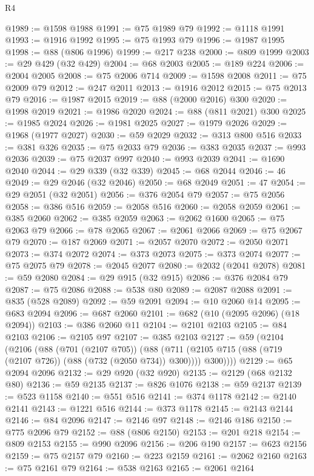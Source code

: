 \begin{lexlean}{R4}
\begin{coremodule}
@1989 := @1598 @1988
@1991 := @75 @1989 @79
@1992 := @1118 @1991
@1993 := @1916 @1992
@1995 := @75 @1993 @79
@1996 := @1987 @1995
@1998 := @88 (@806 @1996)
@1999 := @217 @238
@2000 := @809 @1999
@2003 := @29 @429 (@32 @429)
@2004 := @68 @2003
@2005 := @189 @224
@2006 := @2004 @2005
@2008 := @75 @2006 @714
@2009 := @1598 @2008
@2011 := @75 @2009 @79
@2012 := @247 @2011
@2013 := @1916 @2012
@2015 := @75 @2013 @79
@2016 := @1987 @2015
@2019 := @88 (@2000 @2016) @300
@2020 := @1998 @2019
@2021 := @1986 @2020
@2024 := @88 (@811 @2021) @300
@2025 := @1985 @2024
@2026 := @1981 @2025
@2027 := @1979 @2026
@2029 := @1968 (@1977 @2027)
@2030 := @59 @2029
@2032 := @313 @800 @516
@2033 := @381 @326
@2035 := @75 @2033 @79
@2036 := @383 @2035
@2037 := @993 @2036
@2039 := @75 @2037 @997
@2040 := @993 @2039
@2041 := @1690 @2040
@2044 := @29 @339 (@32 @339)
@2045 := @68 @2044
@2046 := 46
@2049 := @29 @2046 (@32 @2046)
@2050 := @68 @2049
@2051 := 47
@2054 := @29 @2051 (@32 @2051)
@2056 := @376 @2054 @79
@2057 := @75 @2056
@2058 := @386 @516
@2059 := @2058 @516
@2060 := @2058 @2059
@2061 := @385 @2060
@2062 := @385 @2059
@2063 := @2062 @1600
@2065 := @75 @2063 @79
@2066 := @78 @2065
@2067 := @2061 @2066
@2069 := @75 @2067 @79
@2070 := @187 @2069
@2071 := @2057 @2070
@2072 := @2050 @2071
@2073 := @374 @2072
@2074 := @373 @2073
@2075 := @373 @2074
@2077 := @75 @2075 @79
@2078 := @2045 @2077
@2080 := @2032 (@2041 @2078)
@2081 := @59 @2080
@2084 := @29 @915 (@32 @915)
@2086 := @376 @2084 @79
@2087 := @75 @2086
@2088 := @538 @80
@2089 := @2087 @2088
@2091 := @835 (@528 @2089)
@2092 := @59 @2091
@2094 := @10 @2060 @14
@2095 := @683 @2094
@2096 := @687 @2060
@2101 := @682 (@10 (@2095 @2096) (@18 @2094))
@2103 := @386 @2060 @11
@2104 := @2101 @2103
@2105 := @84 @2103
@2106 := @2105 @97
@2107 := @385 @2103
@2127 := @59
    (@2104
      (@2106
        (@88
          (@701 (@2107 @705))
          (@88 (@711 (@2105 @715 (@88 (@719 (@2107 @726)) (@88 (@732 (@2050 @734)) @300)))) @300))))
@2129 := @65 @2094 @2096
@2132 := @29 @920 (@32 @920)
@2135 := @2129 (@68 @2132 @80)
@2136 := @59 @2135
@2137 := @826 @1076
@2138 := @59 @2137
@2139 := @523 @1158
@2140 := @551 @516
@2141 := @374 @1178
@2142 := @2140 @2141
@2143 := @1221 @516
@2144 := @373 @1178
@2145 := @2143 @2144
@2146 := @84 @2096
@2147 := @2146 @97
@2148 := @2146 @186
@2150 := @775 @2096 @79
@2152 := @88 (@806 @2150)
@2153 := @201 @218
@2154 := @809 @2153
@2155 := @990 @2096
@2156 := @206 @190
@2157 := @623 @2156
@2159 := @75 @2157 @79
@2160 := @223 @2159
@2161 := @2062 @2160
@2163 := @75 @2161 @79
@2164 := @538 @2163
@2165 := @2061 @2164

\end{coremodule}
\end{lexlean}
